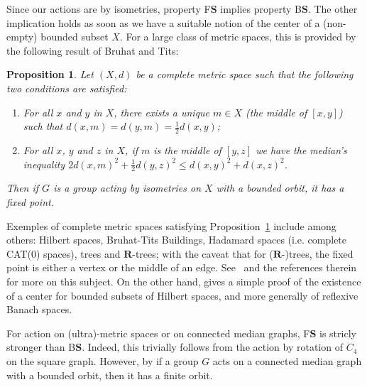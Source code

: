 \documentclass[a4paper]{article}
\newcommand{\PH}[1]{\todo[color={blue!33},size=small]{#1}}
\newtheorem{prop}[lem]{Proposition}
\theoremstyle{definition}
\newcommand*{\field}[1]{\mathbf{#1}}
\newcommand*{\R}{\field{R}}
\newcommand*{\BS}{B$\mathbf{S}$}
\begin{document}
Since our actions are by isometries, property F$\mathbf S$ implies property \BS. The other implication holds as soon as we have a suitable notion of the center of a (non-empty) bounded subset $X$.
For a large class of metric spaces, this is provided by the following result of Bruhat and Tits:
%
%
\begin{prop}\label{Proposition:Mediane}
Let $(X,d)$ be a complete metric space such that the following two conditions are satisfied:
\begin{enumerate}
\item For all $x$ and $y$ in $X$, there exists a unique $m\in X$ (the middle of $[x,y]$) such that $d(x,m)=d(y,m)=\frac12d(x,y)$;
\item For all $x$, $y$ and $z$ in $X$, if $m$ is the middle of $[y,z]$ we have the median's inequality  $2d(x,m)^2+\frac12d(y,z)^2\leq d(x,y)^2+d(x,z)^2$.
\end{enumerate}
Then if $G$ is a group acting by isometries on $X$ with a bounded orbit, it has a fixed point.
\end{prop}
%
%
Exemples of complete metric spaces satisfying Proposition~\ref{Proposition:Mediane} include among others: Hilbert spaces, Bruhat-Tits Buildings, Hadamard spaces (i.e. complete CAT(0) spaces), trees and $\R$-trees; with the caveat that for ($\R$-)trees, the fixed point is either a vertex or the middle of an edge.
See~\cite[Chapter 3.b]{MR1023471} and the references therein for more on this subject.
On the other hand, \cite[Lemma 2.2.7]{Bekka2008} gives a simple proof of the existence of a center for bounded subsets of Hilbert spaces, and more generally of reflexive Banach spaces.

For action on (ultra)-metric spaces or on connected median graphs, F$\mathbf S$ is stricly stronger than \BS. Indeed, this trivially follows from the action by rotation of $C_4$ on the square graph.
However,  by \cite{MR1663779, Cornulier2013} if a group $G$ acts on a connected median graph with a bounded orbit, then it has a finite orbit.\\[3ex]
\end{document}

